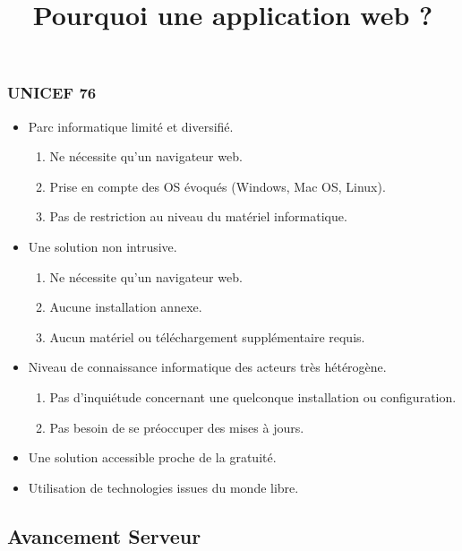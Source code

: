 \subsection{} %

\title{Pourquoi une application web ?}

\begin{frame}
  \frametitle{UNICEF 76}
  \begin{itemize}
    \item Parc informatique limité et diversifié.
      \begin{enumerate}
        \item Ne nécessite qu'un navigateur web.
        \item Prise en compte des OS évoqués (Windows, Mac OS, Linux).
        \item Pas de restriction au niveau du matériel informatique.
      \end{enumerate}
    \item Une solution non intrusive.
      \begin{enumerate}
        \item Ne nécessite qu'un navigateur web.
        \item Aucune installation annexe.
        \item Aucun matériel ou téléchargement supplémentaire requis.
      \end{enumerate}
    \item Niveau de connaissance informatique des acteurs très hétérogène.
      \begin{enumerate}
        \item Pas d'inquiétude concernant une quelconque installation ou configuration.
        \item Pas besoin de se préoccuper des mises à jours.  
      \end{enumerate}
    \item Une solution accessible proche de la gratuité.
    \item Utilisation de technologies issues du monde libre.
  \end{itemize}
\end{frame}

\subsection{Avancement Serveur}


